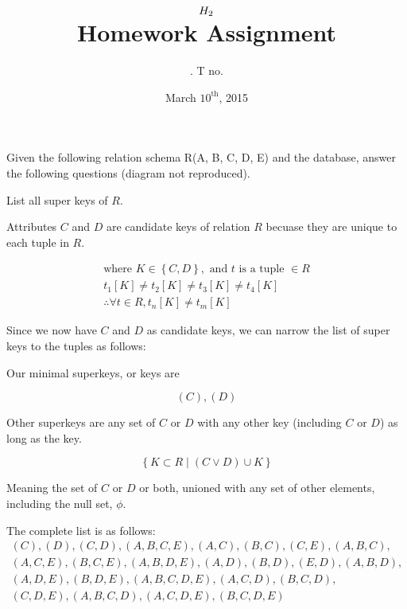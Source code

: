 \documentclass[11pt]{article}
\title{
    $H_{2}$ \\
    {\large Homework Assignment \rom{\hw}}
}
\author{
    \name. T no. \tno
}
\date{March $10^{\text{th}}$, 2015}
\begin{document}
\maketitle

\begin{question}

    Given the following relation schema R(A, B, C, D, E) and the
database, answer the following questions (diagram not reproduced).

\begin{subquestion}
    List all super keys of $R$.

    Attributes $C$ and $D$ are candidate keys of relation $R$ becuase they are unique to each tuple in $R$.

    \begin{align}
        \text{where } K\in\left\{C, D\right\}, \text{ and } t \text{ is a tuple }\in{R}\\
        t_{1}[K] \ne t_{2}[K] \ne t_{3}[K] \ne t_{4}[K]\\
        \therefore \forall t\in{R}, t_{n}[K] \ne t_{m}[K]
    \end{align}

    Since we now have $C$ and $D$ as candidate keys, we can narrow the list of super keys to the tuples as follows:

    Our minimal superkeys, or keys are

    \begin{equation}
        (C), (D)
    \end{equation}

    Other superkeys are any set of $C$ or $D$ with any other key (including $C$ or $D$) as long as the key.

    \begin{equation}
        \left\{ K\subset R \mid (C \lor D)\cup K \right\}
    \end{equation}

    Meaning the set of $C$ or $D$ or both, unioned with any set of other elements, including the null set, $\phi$.

    The complete list is as follows:
    \begin{align*}
        (C), (D), (C, D),
        (A, B, C, E),
        (A, C), (B, C), (C, E),
        (A, B, C),\\ (A, C, E),
        (B, C, E),
        (A, B, D, E),
        (A, D), (B, D), (E, D),
        (A, B, D),\\ (A, D, E),
        (B, D, E),
        (A, B, C, D, E),
        (A, C, D), (B, C, D),\\ (C, D, E),
        (A, B, C, D), (A, C, D, E),
        (B, C, D, E)\\
    \end{align*}
\end{subquestion}


\end{question}
\end{document}
